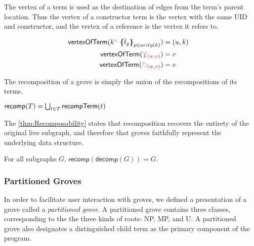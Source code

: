 The vertex of a term is used as the destination of edges from the term's parent location. Thus the vertex of a constructor term is the vertex with the same UID and constructor, and the vertex of a reference is the vertex it refers to. 

\begin{definition}
    \begin{align*}
    \mathsf{vertexOfTerm}(\genericTerm{u}{\subtermMV_p}) &= (u,k)\\
    \mathsf{vertexOfTerm}(\multiref) &= v\\
    \mathsf{vertexOfTerm}(\uniref) &= v
    \end{align*}
\end{definition}    


The recomposition of a grove is simply the union of the recompositions of its terms.

\begin{definition}
    $\mathsf{recomp}(T) = \bigcup_{t \in T}\mathsf{recompTerm}(t)$
\end{definition}

The \autoref{thm:Recomposability} states that recomposition recovers the entirety of the original live subgraph, and therefore that groves faithfully represent the underlying data structure.

\begin{theorem}[Recomposability]
\label{thm:Recomposability}
    For all subgraphs $G$, $\mathsf{recomp}(\mathsf{decomp}(G))=G$.
\end{theorem}

\subsubsection{Partitioned Groves}

In order to facilitate user interaction with groves, we defined a presentation of a grove called a \textit{partitioned grove}. A partitioned grove contains three classes, corresponding to the the three kinds of roots: NP, MP, and U. A partitioned grove also designates a distinguished child term as the primary component of the program.

